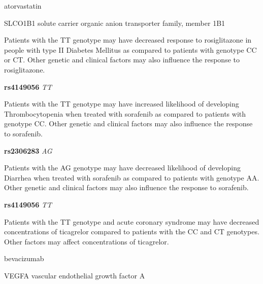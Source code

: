 \documentclass{resume} %
\begin{document}
\begin{rSection}{ atorvastatin }
\begin{rSubsection}{ SLCO1B1 }{ solute carrier organic anion transporter family, member 1B1 }{}{}
\item[] Patients with the TT genotype may have decreased response to rosiglitazone in people with type II Diabetes Mellitus as compared to patients with genotype CC or CT. Other genetic and clinical factors may also influence the response to rosiglitazone.\item \textbf{ rs4149056 } \textit{ TT }
\item[] Patients with the TT genotype may have increased likelihood of developing Thrombocytopenia when treated with sorafenib as compared to patients with genotype CC. Other genetic and clinical factors may also influence the response to sorafenib.\item \textbf{ rs2306283 } \textit{ AG }
\item[] Patients with the AG genotype may have decreased likelihood of developing Diarrhea when treated with sorafenib as compared to patients with genotype AA. Other genetic and clinical factors may also influence the response to sorafenib.\item \textbf{ rs4149056 } \textit{ TT }
\item[] Patients with the TT genotype and acute coronary syndrome may have decreased concentrations of ticagrelor compared to patients with the CC and CT genotypes. Other factors may affect concentrations of ticagrelor.
\end{rSubsection}

\end{rSection}\begin{rSection}{ bevacizumab }
\item[]

\begin{rSubsection}{ VEGFA }{ vascular endothelial growth factor A }{}{}
\item[]


\end{rSubsection}
\end{rSection}
\end{document}
